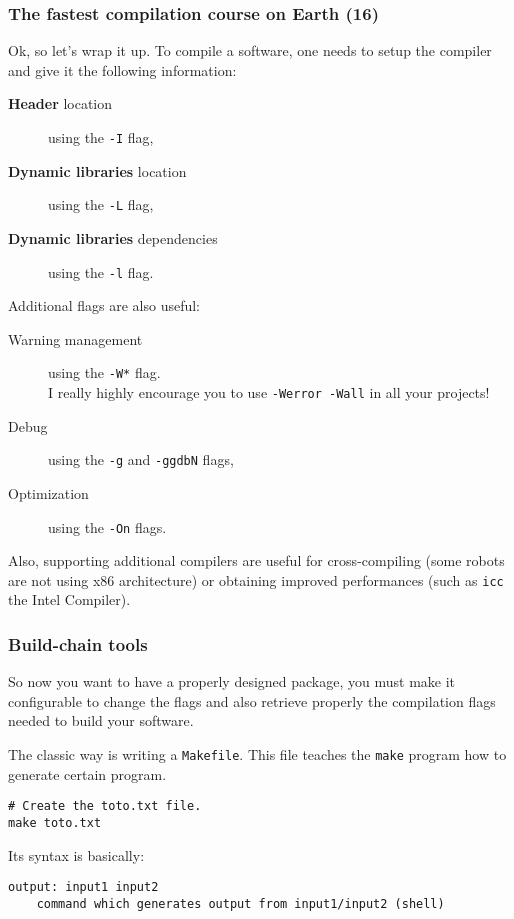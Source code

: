 \documentclass[hyperref={pdfpagelabels=false}]{beamer}
\begin{document}
\begin{frame}[fragile]
\frametitle{The fastest compilation course on Earth (16)}

Ok, so let's wrap it up. To compile a software, one needs to setup the
compiler and give it the following information:

\begin{description}
\item[\textbf{Header} location] using the \texttt{-I} flag,
\item[\textbf{Dynamic libraries} location] using the \texttt{-L} flag,
\item[\textbf{Dynamic libraries} dependencies] using the \texttt{-l}
  flag.
\end{description}

Additional flags are also useful:
\begin{description}
\item[Warning management] using the \texttt{-W*} flag.\\ I really highly
  encourage you to use \texttt{-Werror -Wall} in all your projects!
\item[Debug] using the \texttt{-g} and \texttt{-ggdbN} flags,
\item[Optimization] using the \texttt{-On} flags.
\end{description}

Also, supporting additional compilers are useful for cross-compiling
(some robots are not using x86 architecture) or obtaining improved
performances (such as \texttt{icc} the Intel Compiler).
\end{frame}


\begin{frame}[fragile]
\frametitle{Build-chain tools}

So now you want to have a properly designed package, you must make it
configurable to change the flags and also retrieve properly the
compilation flags needed to build your software.

\vspace{0.3cm}

The classic way is writing a \texttt{Makefile}. This file teaches the
\texttt{make} program how to generate certain program.

\begin{verbatim}
# Create the toto.txt file.
make toto.txt
\end{verbatim}

Its syntax is basically:
\begin{verbatim}
output: input1 input2
    command which generates output from input1/input2 (shell)
\end{verbatim}
\end{frame}
\end{document}
